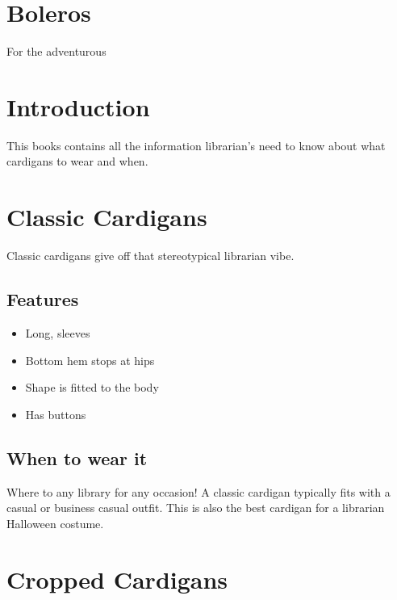 \documentclass[
  openany]{book}
\providecommand{\tightlist}{%
  \setlength{\itemsep}{0pt}\setlength{\parskip}{0pt}}
\begin{document}
\hypertarget{boleros}{%
\chapter{Boleros}\label{boleros}}

For the adventurous

\hypertarget{introduction-1}{%
\chapter{Introduction}\label{introduction-1}}

This books contains all the information librarian's need to know about what cardigans to wear and when.

\hypertarget{classic-cardigans-1}{%
\chapter{Classic Cardigans}\label{classic-cardigans-1}}

Classic cardigans give off that stereotypical librarian vibe.

\hypertarget{features}{%
\section{Features}\label{features}}

\begin{itemize}
\tightlist
\item
  Long, sleeves
\item
  Bottom hem stops at hips
\item
  Shape is fitted to the body
\item
  Has buttons
\end{itemize}

\hypertarget{when-to-wear-it}{%
\section{When to wear it}\label{when-to-wear-it}}

Where to any library for any occasion! A classic cardigan typically fits with a casual or business casual outfit. This is also the best cardigan for a librarian Halloween costume.

\hypertarget{cropped-cardigans-1}{%
\chapter{Cropped Cardigans}\label{cropped-cardigans-1}}
\end{document}
